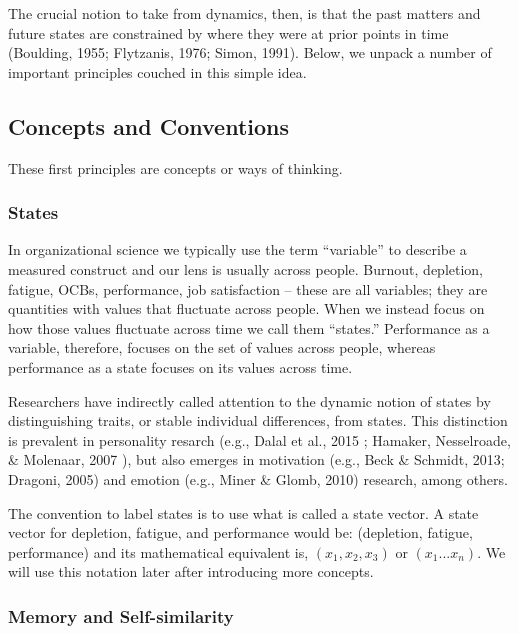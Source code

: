 \documentclass[english,,man]{apa6}
\theoremstyle{definition}
\theoremstyle{definition}
\theoremstyle{definition}
\theoremstyle{remark}
\begin{document}
The crucial notion to take from dynamics, then, is that the past matters
and future states are constrained by where they were at prior points in
time (Boulding, 1955; Flytzanis, 1976; Simon, 1991). Below, we unpack a
number of important principles couched in this simple idea.

\hypertarget{concepts-and-conventions}{%
\subsection{Concepts and Conventions}\label{concepts-and-conventions}}

These first principles are concepts or ways of thinking.

\hypertarget{states}{%
\subsubsection{States}\label{states}}

In organizational science we typically use the term \enquote{variable}
to describe a measured construct and our lens is usually across people.
Burnout, depletion, fatigue, OCBs, performance, job satisfaction --
these are all variables; they are quantities with values that fluctuate
across people. When we instead focus on how those values fluctuate
across time we call them \enquote{states.} Performance as a variable,
therefore, focuses on the set of values across people, whereas
performance as a state focuses on its values across time.

Researchers have indirectly called attention to the dynamic notion of
states by distinguishing traits, or stable individual differences, from
states. This distinction is prevalent in personality resarch (e.g.,
Dalal et al., 2015 ; Hamaker, Nesselroade, \& Molenaar, 2007 ), but also
emerges in motivation (e.g., Beck \& Schmidt, 2013; Dragoni, 2005) and
emotion (e.g., Miner \& Glomb, 2010) research, among others.

The convention to label states is to use what is called a state vector.
A state vector for depletion, fatigue, and performance would be:
(depletion, fatigue, performance) and its mathematical equivalent is,
\((x_1, x_2, x_3)\) or \((x_1 ...x_n)\). We will use this notation later
after introducing more concepts.

\hypertarget{memory-and-self-similarity}{%
\subsubsection{Memory and
Self-similarity}\label{memory-and-self-similarity}}
\end{document}
